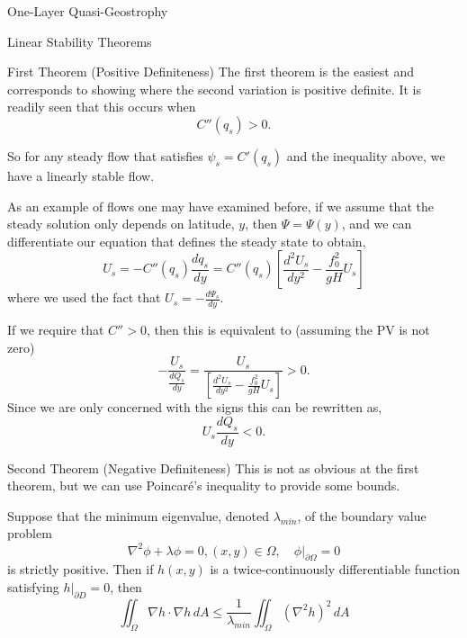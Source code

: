 \documentclass[12pt]{article}
\begin{document}
\begin{section}{One-Layer Quasi-Geostrophy}
\begin{subsection}{Linear Stability Theorems}
        \begin{subsubsection}{First Theorem (Positive Definiteness)}
            The first theorem is the easiest and corresponds to showing where the second variation is positive definite.  It is readily seen that this occurs when
            $$
            C''(q_s) > 0.
            $$

            So for any steady flow that satisfies $\psi_s = C'(q_s)$ and the inequality above, we have a linearly stable flow.

            As an example of flows one may have examined before, if we assume that the steady solution only depends on latitude, $y$, then $\Psi = \Psi(y)$, and we can differentiate our equation that defines the steady state to obtain,
            $$
            U_s = -C''(q_s) \frac{dq_s}{dy} = C''(q_s) \left[ \frac{d^2 U_s}{dy^2} - \frac{f_0^2}{gH} U_s \right]
            $$
            where we used the fact that $U_s = - \frac{d \Psi_s}{dy}$.

            If we require that $C'' > 0$, then this is equivalent to (assuming the PV is not zero)
            $$
            -\frac{U_s}{\frac{dQ_s}{dy}} = \frac{U_s}{\left[ \frac{d^2 U_s}{dy^2} - \frac{f_0^2}{gH} U_s\right]} > 0.
            $$
            Since we are only concerned with the signs this can be rewritten as,
            $$
            U_s \frac{d Q_s}{dy} < 0.
            $$
        \end{subsubsection}

        \begin{subsubsection}{Second Theorem (Negative Definiteness)}
            This is not as obvious at the first theorem, but we can use Poincar\'e's inequality to provide some bounds.

            Suppose that the minimum eigenvalue, denoted $\lambda_{min}$, of the boundary value problem
            $$
                \nabla^2 \phi + \lambda \phi = 0, (x,y) \in \Omega, \quad
                \left. \phi \right|_{\partial \Omega} = 0
            $$
            is strictly positive. Then if $h(x,y)$ is a twice-continuously differentiable function satisfying $\left. h\right|_{\partial D} = 0$, then
            $$
                \iint_\Omega\nabla h \cdot\nabla h \, dA \le \frac{1}{\lambda_{min}}\iint_\Omega (\nabla^2 h)^2 \, dA
            $$


\end{subsubsection}
\end{subsection}
\end{section}
\end{document}
